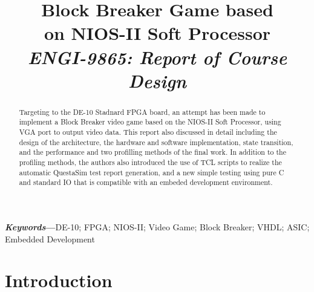 \documentclass[conference]{IEEEtran}
\title{
    Block Breaker Game based\\on NIOS-II Soft Processor \\ 
    \emph{ENGI-9865: Report of Course Design}
}
\author{
    \IEEEauthorblockN{
        Jiabao Guo
    }
    \IEEEauthorblockA{
        Student Number: 202096888 \\
        jiabaog@mun.ca \\
        Memorial University of Newfoundland
    }
}
\begin{document}
\maketitle

\thispagestyle{plain}
\pagestyle{plain}

\begin{abstract}
Targeting to the DE-10 Stadnard FPGA board, an attempt has been made to implement a Block Breaker video game based on the NIOS-II Soft Processor, using VGA port to output video data. This report also discussed in detail including the design of the architecture, the hardware and software implementation, state transition, and the performance and two profilling methods of the final work. In addition to the profiling methods, the authors also introduced the use of TCL scripts to realize the automatic QuestaSim test report generation, and a new simple testing using pure C and standard IO that is compatible with an embeded development environment.
\end{abstract}

\textbf{\textit{Keywords}---}DE-10; FPGA; NIOS-II; Video Game; Block Breaker; VHDL; ASIC; Embedded Development

%

\tableofcontents


\section{Introduction}
\end{document}
